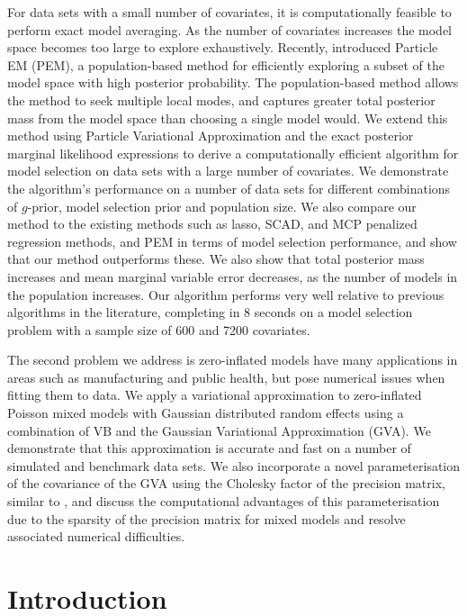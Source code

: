 For data sets with a small number of covariates, it is computationally feasible
to perform exact model averaging. As the number of covariates increases the
model space becomes too large to explore exhaustively.  Recently,
\cite{Rockova2017} introduced Particle EM (PEM), a population-based method for
efficiently exploring a subset of the model space with high posterior
probability. The population-based method allows the method to seek multiple
local modes, and captures greater total posterior mass from the model space
than choosing a single model would. We extend this method using Particle
Variational Approximation and the exact posterior marginal likelihood
expressions to derive a computationally efficient algorithm for model selection
on data sets with a large number of covariates. We demonstrate the algorithm's
performance on a number of data sets for different combinations of $g$-prior,
model selection prior and population size. We also compare our method to the
existing methods such as lasso, SCAD, and MCP penalized regression methods, and PEM in terms of model selection
performance,  and show that our method outperforms these. We also show that
total posterior mass increases and mean marginal variable error decreases, as
the number of models in the population increases.
Our algorithm performs very well relative
to previous algorithms in the literature, completing in 8 seconds on a model
selection problem with a sample size of 600 and 7200 covariates.

The second problem we address is zero-inflated models have many
applications in areas such as manufacturing and public health, but pose
numerical issues when fitting them to data. We apply a variational
approximation to zero-inflated Poisson mixed models with Gaussian distributed
random effects using a combination of VB and the Gaussian
Variational Approximation (GVA). We demonstrate that this approximation is accurate
and fast on a number of simulated and benchmark data sets. We also incorporate
a novel parameterisation of the covariance of the GVA using the Cholesky factor of the precision matrix, similar to
\cite{Tan2018}, and discuss the computational advantages of this
parameterisation due to the sparsity of the precision matrix for mixed models
and resolve associated numerical difficulties.


\chapter{Introduction}

